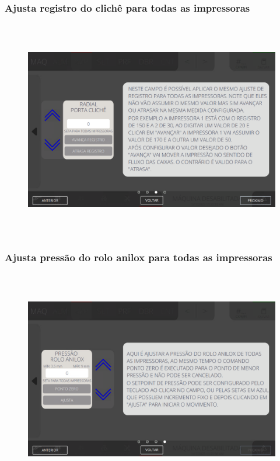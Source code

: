 \newpage
\thispagestyle{fancy}
\vspace*{40 pt}
\subsubsection{\small{Ajusta registro do clichê para todas as impressoras}}\label{telaAjustesImpressorasSegundaTelaDeAjustesImpressorasAjustaRegistroDoClicheParaTodasAsImpressoras}
\vspace*{\fill}
\begin{figure}[h]
  \centering
  \includegraphics[width=576px,height=360px]{src/imagesFlexo/04-printter/01-printters/settings/e-11.png}
\end{figure}
\vspace*{\fill}

\newpage
\thispagestyle{fancy}
\vspace*{40 pt}
\subsubsection{\small{Ajusta pressão do rolo anilox para todas as impressoras}}\label{telaAjustesImpressorasSegundaTelaDeAjustesImpressorasAjustaPressaoDoRoloAniloxParaTodasAsImpressoras}
\vspace*{\fill}
\begin{figure}[h]
  \centering
  \includegraphics[width=576px,height=360px]{src/imagesFlexo/04-printter/01-printters/settings/e-12.png}
\end{figure}
\vspace*{\fill}
